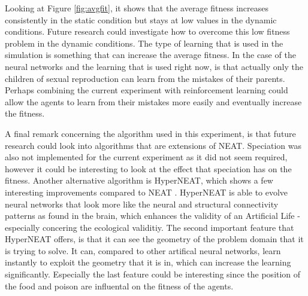 Looking at Figure \ref{fig:avgfit}, it shows that the average fitness increases consistently in the static condition but stays at low values in the dynamic conditions.
Future research could investigate how to overcome this low fitness problem in the dynamic conditions.
The type of learning that is used in the simulation is something that can increase the average fitness.
In the case of the neural networks and the learning that is used right now, is that actually only the children of sexual reproduction can learn from the mistakes of their parents.
Perhaps combining the current experiment with reinforcement learning could allow the agents to learn from their mistakes more easily and eventually increase the fitness. %

A final remark concerning the algorithm used in this experiment, is that future research could look into algorithms that are extensions of NEAT.
Speciation was also not implemented for the current experiment as it did not seem required, however it could be interesting to look at the effect that speciation has on the fitness.
Another alternative algorithm is HyperNEAT, which shows a few interesting improvements compared to NEAT \cite{stanleyhypercube}.
HyperNEAT is able to evolve neural networks that look more like the neural and structural connectivity patterns as found in the brain, which enhances the validity of an Artificial Life - especially concering the ecological validitiy.
The second important feature that HyperNEAT offers, is that it can see the geometry of the problem domain that it is trying to solve.
It can, compared to other artifical neural networks, learn instantly to exploit the geometry that it is in, which can increase the learning significantly.
Especially the last feature could be interesting since the position of the food and poison are influental on the fitness of the agents.